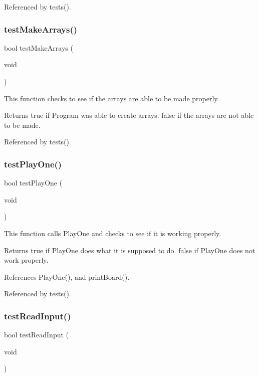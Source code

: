 Referenced by tests().

\mbox{\label{tests_8h_af6e338851f3ccb4714e1bfb06ec4b428}} 
\subsubsection{test\+Make\+Arrays()}
{\footnotesize\ttfamily bool test\+Make\+Arrays (\begin{DoxyParamCaption}\item[{void}]{ }\end{DoxyParamCaption})}

This function checks to see if the arrays are able to be made properly. \begin{DoxyReturn}{Returns}
true if Program was able to create arrays. false if the arrays are not able to be made. 
\end{DoxyReturn}


Referenced by tests().

\mbox{\label{tests_8h_aa4c8095a20d90a18d843ab63ecd02d00}} 
\subsubsection{test\+Play\+One()}
{\footnotesize\ttfamily bool test\+Play\+One (\begin{DoxyParamCaption}\item[{void}]{ }\end{DoxyParamCaption})}

This function calls Play\+One and checks to see if it is working properly. \begin{DoxyReturn}{Returns}
true if Play\+One does what it is supposed to do. false if Play\+One does not work properly. 
\end{DoxyReturn}


References Play\+One(), and print\+Board().



Referenced by tests().

\mbox{\label{tests_8h_aa89f64db87aebe77bd891e2894595e4e}} 
\subsubsection{test\+Read\+Input()}
{\footnotesize\ttfamily bool test\+Read\+Input (\begin{DoxyParamCaption}\item[{void}]{ }\end{DoxyParamCaption})}

